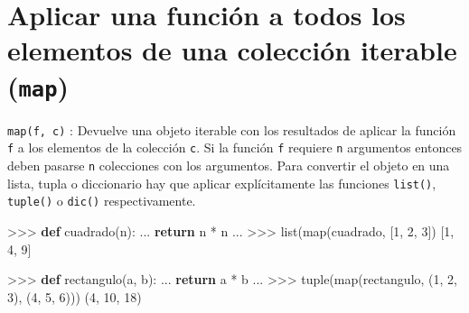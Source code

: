 \documentclass[
  spanish,
  a4paper,
]{scrreport}
\newenvironment{Shaded}{\begin{snugshade}}{\end{snugshade}}
\newcommand{\BuiltInTok}[1]{\textcolor[rgb]{0.00,0.23,0.31}{#1}}
\newcommand{\ControlFlowTok}[1]{\textcolor[rgb]{0.00,0.23,0.31}{\textbf{#1}}}
\newcommand{\DecValTok}[1]{\textcolor[rgb]{0.68,0.00,0.00}{#1}}
\newcommand{\KeywordTok}[1]{\textcolor[rgb]{0.00,0.23,0.31}{\textbf{#1}}}
\newcommand{\NormalTok}[1]{\textcolor[rgb]{0.00,0.23,0.31}{#1}}
\newcommand{\OperatorTok}[1]{\textcolor[rgb]{0.37,0.37,0.37}{#1}}
\begin{document}
\section{\texorpdfstring{Aplicar una función a todos los elementos de
una colección iterable
(\texttt{map})}{Aplicar una función a todos los elementos de una colección iterable (map)}}\label{aplicar-una-funciuxf3n-a-todos-los-elementos-de-una-colecciuxf3n-iterable-map}

\texttt{map(f,\ c)} : Devuelve una objeto iterable con los resultados de
aplicar la función \texttt{f} a los elementos de la colección
\texttt{c}. Si la función \texttt{f} requiere \texttt{n} argumentos
entonces deben pasarse \texttt{n} colecciones con los argumentos. Para
convertir el objeto en una lista, tupla o diccionario hay que aplicar
explícitamente las funciones \texttt{list()}, \texttt{tuple()} o
\texttt{dic()} respectivamente.

\begin{Shaded}
\begin{Highlighting}[]
\OperatorTok{\textgreater{}\textgreater{}\textgreater{}} \KeywordTok{def}\NormalTok{ cuadrado(n):}
\NormalTok{...     }\ControlFlowTok{return}\NormalTok{ n }\OperatorTok{*}\NormalTok{ n}
\NormalTok{...}
\OperatorTok{\textgreater{}\textgreater{}\textgreater{}} \BuiltInTok{list}\NormalTok{(}\BuiltInTok{map}\NormalTok{(cuadrado, [}\DecValTok{1}\NormalTok{, }\DecValTok{2}\NormalTok{, }\DecValTok{3}\NormalTok{])}
\NormalTok{[}\DecValTok{1}\NormalTok{, }\DecValTok{4}\NormalTok{, }\DecValTok{9}\NormalTok{]}
\end{Highlighting}
\end{Shaded}

\begin{Shaded}
\begin{Highlighting}[]
\OperatorTok{\textgreater{}\textgreater{}\textgreater{}} \KeywordTok{def}\NormalTok{ rectangulo(a, b):}
\NormalTok{...     }\ControlFlowTok{return}\NormalTok{ a }\OperatorTok{*}\NormalTok{ b}
\NormalTok{...}
\OperatorTok{\textgreater{}\textgreater{}\textgreater{}} \BuiltInTok{tuple}\NormalTok{(}\BuiltInTok{map}\NormalTok{(rectangulo, (}\DecValTok{1}\NormalTok{, }\DecValTok{2}\NormalTok{, }\DecValTok{3}\NormalTok{), (}\DecValTok{4}\NormalTok{, }\DecValTok{5}\NormalTok{, }\DecValTok{6}\NormalTok{)))}
\NormalTok{(}\DecValTok{4}\NormalTok{, }\DecValTok{10}\NormalTok{, }\DecValTok{18}\NormalTok{)}
\end{Highlighting}
\end{Shaded}
\end{document}
